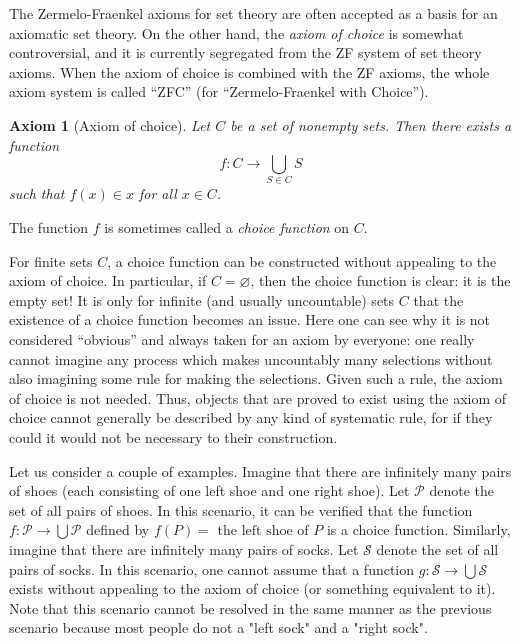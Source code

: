 \documentclass{article}
\begin{document}
\newtheorem*{axiom*}{Axiom}

The Zermelo-Fraenkel axioms for set theory are often accepted as a basis for an axiomatic set theory. 
On the other hand, the \emph{axiom of choice} is somewhat controversial, and it is currently segregated from the ZF system of set theory axioms.  When the axiom of choice is combined with the ZF axioms, the whole axiom system is
called ``ZFC'' (for ``Zermelo-Fraenkel with Choice'').

\begin{axiom*}[Axiom of choice]
Let $C$ be a set of nonempty sets. Then there exists a function
\[
f\colon C\to \bigcup_{S\in C} S
\]
such that $f(x) \in x$ for all $x \in C$.
\end{axiom*}
The function $f$ is sometimes called a \emph{choice function} on $C$.

For finite sets $C$, a choice function can be constructed without appealing to the axiom of choice.  In particular, if $C=\varnothing$, then the choice function is clear: it is the empty set!  It is only for infinite (and usually uncountable) sets $C$ that the existence of a choice function becomes an issue. Here one can see why it is not considered ``obvious'' and always taken for an axiom by everyone:
one really cannot imagine any process which makes uncountably many selections without also imagining some rule for making the selections. Given such a rule, the axiom of choice is not needed.  Thus, objects that are proved to exist using the axiom of choice cannot generally be described by any kind of systematic rule, for if they could it would not be necessary to their construction.

Let us consider a couple of examples.  Imagine that there are infinitely many pairs of shoes (each consisting of one left shoe and one right shoe).  Let $\mathcal{P}$ denote the set of all pairs of shoes.  In this scenario, it can be verified that the function $\displaystyle f \colon \mathcal{P} \to \bigcup \mathcal{P}$ defined by $f(P)=\text{ the left shoe of }P$ is a choice function.  Similarly, imagine that there are infinitely many pairs of socks.  Let $\mathcal{S}$ denote the set of all pairs of socks.  In this scenario, one cannot assume that a function $\displaystyle g \colon \mathcal{S} \to \bigcup \mathcal{S}$ exists without appealing to the axiom of choice (or something equivalent to it).  Note that this scenario cannot be resolved in the same manner as the previous scenario because most people do not  a "left sock" and a "right sock".
\end{document}
